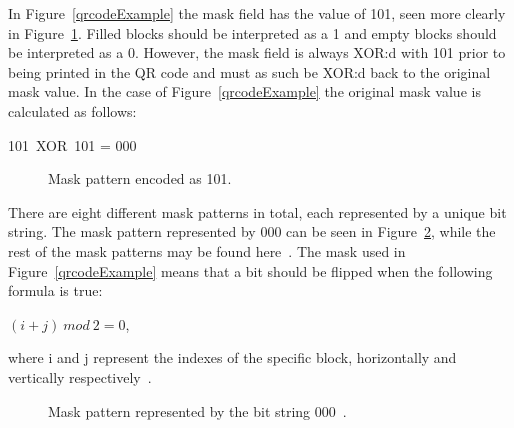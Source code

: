 In Figure~\ref{qrcodeExample} the mask field has the value of 101, seen more clearly in Figure~\ref{qrcodeExampleStep3}. Filled blocks should be interpreted as a 1 and empty blocks should be interpreted as a 0. However, the mask field is always XOR:d with 101 prior to being printed in the QR code and must as such be XOR:d back to the original mask value. In the case of Figure~\ref{qrcodeExample} the original mask value is calculated as follows:

\begin{center}
	101~XOR~101 = 000
\end{center}

	\begin{figure}[H]%
		\centering
		\caption{Mask pattern encoded as 101.}
		\label{qrcodeExampleStep3}
	\end{figure}

There are eight different mask patterns in total, each represented by a unique bit string. The mask pattern represented by 000 can be seen in Figure~\ref{qrcodemaskpattern}, while the rest of the mask patterns may be found here~\cite{qrcodeMaskPatterns}. The mask used in Figure~\ref{qrcodeExample} means that a bit should be flipped when the following formula is true:

\begin{center}
	\((i+j)~mod~2=0\), 

	where i and j represent the indexes of the specific block, horizontally and vertically respectively~\cite{qrcodeMaskPatterns}.
\end{center}

	\begin{figure}[H]%
		\centering
		\caption{Mask pattern represented by the bit string 000~\cite{qrcodeMaskPatterns}.}
		\label{qrcodemaskpattern}
	\end{figure}
	
